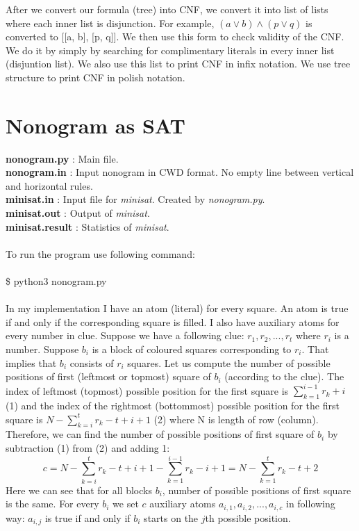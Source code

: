 \documentclass{article}
\begin{document}
After we convert our formula (tree) into CNF, we convert it into list of lists where each inner list is disjunction. For example, $(a \vee b) \wedge (p \vee q)$ is converted to [[a, b], [p, q]]. We then use this form to check validity of the CNF. We do it by simply by searching for complimentary literals in every inner list (disjuntion list). We also use this list to print CNF in infix notation. We use  tree structure to print CNF in polish notation.

\section{Nonogram as SAT}

\textbf{nonogram.py} : Main file.\\
\textbf{nonogram.in} : Input nonogram in CWD format. No empty line between vertical and horizontal rules.\\
\textbf{minisat.in} : Input file for \textit{minisat}. Created by \textit{nonogram.py}.\\
\textbf{minisat.out} : Output of \textit{minisat}.\\
\textbf{minisat.result} : Statistics of \textit{minisat}.\\
\\
To run the program use following command:\\
\\
\$ python3 nonogram.py\\
\\

In my implementation I have an atom (literal) for every square. An atom is true if and only if the corresponding square is filled. I also have auxiliary atoms for every number in clue. Suppose we have a following clue: $r_1, r_2, ..., r_t$ where $r_i$ is a number. Suppose $b_i$ is a block of coloured squares corresponding to $r_i$. That implies that $b_i$ consists of $r_i$ squares. Let us compute the number of possible positions of first (leftmost or topmost) square of $b_i$ (according to the clue). The index of leftmost (topmost) possible position for the first square is $\sum_{k=1}^{i-1} r_k + i$ (1) and the index of the rightmost (bottommost) possible position for the first square is $N - \sum_{k=i}^{t} r_k - t + i + 1$ (2) where N is length of row (column). Therefore, we can find the number of possible positions of first square of $b_i$ by subtraction (1) from (2) and adding 1:
$$c = N - \sum_{k=i}^{t} r_k - t + i + 1 - \sum_{k=1}^{i-1} r_k - i + 1 = N - \sum_{k=1}^{t} r_k - t + 2$$
Here we can see that for all blocks $b_i$, number of possible positions of first square is the same. For every $b_i$ we set $c$ auxiliary atoms $a_{i,1}, a_{i,2}, ..., a_{i,c}$ in following way: $a_{i,j}$ is true if and only if $b_i$ starts on the $j$th possible position.
\end{document}
